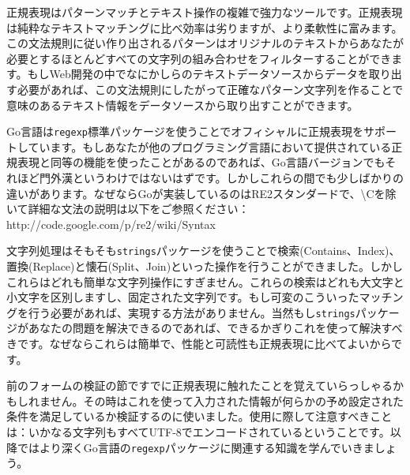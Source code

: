 正規表現はパターンマッチとテキスト操作の複雑で強力なツールです。正規表現は純粋なテキストマッチングに比べ効率は劣りますが、より柔軟性に富みます。この文法規則に従い作り出されるパターンはオリジナルのテキストからあなたが必要とするほとんどすべての文字列の組み合わせをフィルターすることができます。もしWeb開発の中でなにかしらのテキストデータソースからデータを取り出す必要があれば、この文法規則にしたがって正確なパターン文字列を作ることで意味のあるテキスト情報をデータソースから取り出すことができます。

Go言語は\texttt{regexp}標準パッケージを使うことでオフィシャルに正規表現をサポートしています。もしあなたが他のプログラミング言語において提供されている正規表現と同等の機能を使ったことがあるのであれば、Go言語バージョンでもそれほど門外漢というわけではないはずです。しかしこれらの間でも少しばかりの違いがあります。なぜならGoが実装しているのはRE2スタンダードで、\textbackslash Cを除いて詳細な文法の説明は以下をご参照ください：http://code.google.com/p/re2/wiki/Syntax

文字列処理はそもそも\texttt{strings}パッケージを使うことで検索(Contains、Index)、置換(Replace)と懐石(Split、Join)といった操作を行うことができました。しかしこれらはどれも簡単な文字列操作にすぎません。これらの検索はどれも大文字と小文字を区別しますし、固定された文字列です。もし可変のこういったマッチングを行う必要があれば、実現する方法がありません。当然もし\texttt{strings}パッケージがあなたの問題を解決できるのであれば、できるかぎりこれを使って解決すべきです。なぜならこれらは簡単で、性能と可読性も正規表現に比べてよいからです。

前のフォームの検証の節ですでに正規表現に触れたことを覚えていらっしゃるかもしれません。その時はこれを使って入力された情報が何らかの予め設定された条件を満足しているか検証するのに使いました。使用に際して注意すべきことは：いかなる文字列もすべてUTF-8でエンコードされているということです。以降ではより深くGo言語の\texttt{regexp}パッケージに関連する知識を学んでいきましょう。
